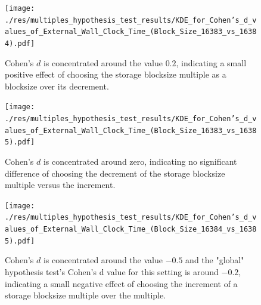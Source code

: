 \documentclass[twocolumn]{article}
\begin{document}
\begin{figure}[htb]
    \begin{minipage}{0.475 \textwidth}
        \centering
        \texttt{[image: ./res/multiples\_hypothesis\_test\_results/KDE\_for\_Cohen's\_d\_values\_of\_External\_Wall\_Clock\_Time\_(Block\_Size\_16383\_vs\_16384).pdf]}
        \caption{Cohen's \(d\) is concentrated around the value \( 0.2 \), indicating a small positive effect of choosing the storage blocksize multiple as a blocksize over its decrement.}
        \label{fig:KDE_for_Cohen's_d_values_of_External_Wall_Clock_Time_(Block_Size_16383_vs_16384).pdf}
    \end{minipage}
\end{figure}

\begin{figure}[htb]
    \begin{minipage}{0.475 \textwidth}
        \centering
        \texttt{[image: ./res/multiples\_hypothesis\_test\_results/KDE\_for\_Cohen's\_d\_values\_of\_External\_Wall\_Clock\_Time\_(Block\_Size\_16383\_vs\_16385).pdf]}
        \caption{Cohen's \(d\) is concentrated around zero, indicating no significant difference of choosing the decrement of the storage blocksize multiple versus the increment.}
        \label{fig:KDE_for_Cohen's_d_values_of_External_Wall_Clock_Time_(Block_Size_16383_vs_16385).pdf}
    \end{minipage}
\end{figure}

\begin{figure}[htb]
    \begin{minipage}{0.475 \textwidth}
        \centering
        \texttt{[image: ./res/multiples\_hypothesis\_test\_results/KDE\_for\_Cohen's\_d\_values\_of\_External\_Wall\_Clock\_Time\_(Block\_Size\_16384\_vs\_16385).pdf]}
        \caption{Cohen's \(d\) is concentrated around the value \( -0.5 \) and the "global" hypothesis test's Cohen's d value for this setting is around \( -0.2 \),
            indicating a small negative effect of choosing the increment of a storage blocksize multiple over the multiple.}
        \label{fig:KDE_for_Cohen's_d_values_of_External_Wall_Clock_Time_(Block_Size_16384_vs_16385).pdf}
    \end{minipage}
\end{figure}
\end{document}

